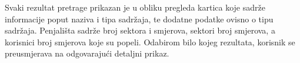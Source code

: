 Svaki rezultat pretrage prikazan je u obliku pregleda kartica koje sadrže informacije poput naziva i tipa sadržaja, te dodatne podatke ovisno o tipu sadržaja. Penjališta sadrže broj sektora i smjerova, sektori broj smjerova, a korisnici broj smjerova koje su popeli. Odabirom bilo kojeg rezultata, korisnik se preusmjerava na odgovarajući detaljni prikaz. 

